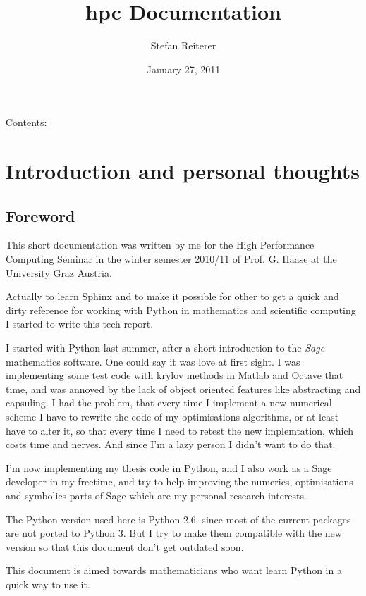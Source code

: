 \documentclass[letterpaper,10pt,english]{manual}
\title{hpc Documentation}
\date{January 27, 2011}
\author{Stefan Reiterer}
\begin{document}
\maketitle
\tableofcontents
\hypertarget{--doc-index}{}


Contents:

\resetcurrentobjects
\hypertarget{--doc-Introduction}{}

\chapter{Introduction and personal thoughts}


\section{Foreword}

This short documentation was written by me for the High Performance Computing Seminar
in the winter semester 2010/11 of Prof. G. Haase at the University Graz Austria.

Actually to learn Sphinx and to make it possible for other to get a quick and dirty reference
for working with Python in mathematics and scientific computing I started to write this tech report.

I started with Python last summer, after a short introduction to the \emph{Sage} mathematics software. One could
say it was love at first sight. I was implementing some test code with krylov methods in Matlab and Octave that
time, and was annoyed by the lack of object oriented features like abstracting and capsuling. I had the problem, that
every time I implement a new numerical scheme I have to rewrite the code of my optimisations algorithms, or at least have
to alter it, so that every time I need to retest the new implemtation, which costs time and nerves. And since I'm a
lazy person I didn't want to do that.

I'm now implementing my thesis code in Python, and I also work as a Sage developer in my freetime, and try to help
improving the numerics, optimisations and symbolics parts of Sage which are my personal research interests.

The Python version used here is Python 2.6. since most of the current packages are not ported to Python 3.
But I try to make them compatible with the new version so that this document don't get outdated soon.

This document is aimed towards mathematicians who want learn Python in a quick way to use it.
\end{document}
